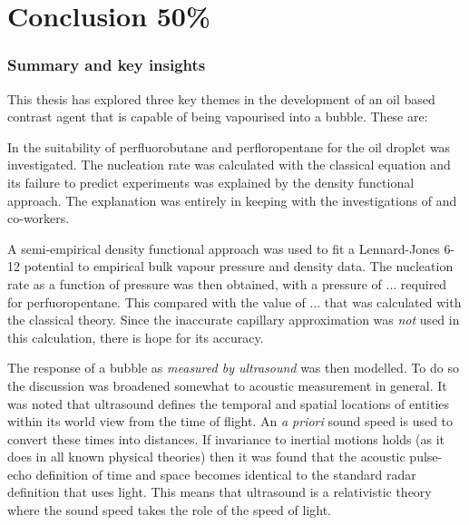 

\chapter{Conclusion 50\%}\label{ch:discussion}

\subsection{Summary and key insights}
This thesis has explored  three key themes in the  development of 
an oil based contrast agent that is capable of being vapourised into a bubble.
These are:

In  the suitability of perfluorobutane and perfloropentane  for the oil droplet
was investigated.
The nucleation rate was calculated with the classical equation and its failure to predict experiments was explained by the  density functional approach.
The explanation was entirely in keeping with the investigations of \cite{Oxtoby1988} and co-workers.

A semi-empirical density functional approach was used to fit a Lennard-Jones 6-12 potential to empirical bulk vapour pressure
and density data. %
The nucleation rate as a function of pressure was then obtained,
with a pressure of ... required for perfuoropentane.
This compared with the value of  ... that was calculated with the classical theory.
Since the inaccurate capillary approximation was {\em not} used in this calculation, 
there is hope for its accuracy.

The  response of a bubble as  {\em  measured by ultrasound} was then modelled. %
To do so the discussion was broadened somewhat to acoustic measurement in general.
It was noted that ultrasound defines the temporal and spatial locations of entities within its world view from the time of flight.
An {\em a priori} sound speed is  used to convert these times into distances.
If  invariance to  inertial motions  holds (as it does in all known physical theories) 
then it was found that the acoustic pulse-echo definition of time and space becomes identical to the 
standard radar definition that uses light.
This means that ultrasound is a relativistic theory where the sound speed takes the role of the speed of light.


